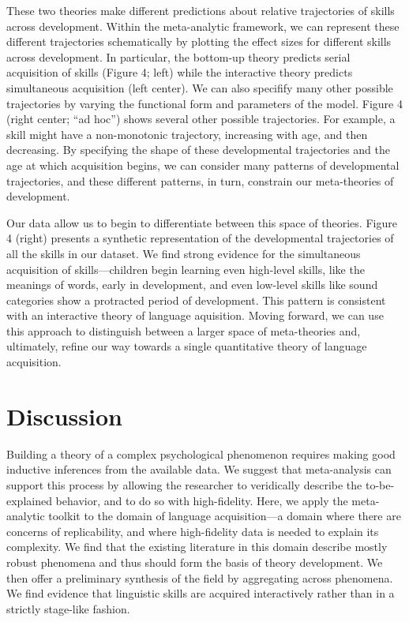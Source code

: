\documentclass[english,floatsintext,man]{apa6}
\begin{document}
These two theories make different predictions about relative
trajectories of skills across development. Within the meta-analytic
framework, we can represent these different trajectories schematically
by plotting the effect sizes for different skills across development. In
particular, the bottom-up theory predicts serial acquisition of skills
(Figure 4; left) while the interactive theory predicts simultaneous
acquisition (left center). We can also specifify many other possible
trajectories by varying the functional form and parameters of the model.
Figure 4 (right center; \enquote{ad hoc}) shows several other possible
trajectories. For example, a skill might have a non-monotonic
trajectory, increasing with age, and then decreasing. By specifying the
shape of these developmental trajectories and the age at which
acquisition begins, we can consider many patterns of developmental
trajectories, and these different patterns, in turn, constrain our
meta-theories of development.

Our data allow us to begin to differentiate between this space of
theories. Figure 4 (right) presents a synthetic representation of the
developmental trajectories of all the skills in our dataset. We find
strong evidence for the simultaneous acquisition of skills---children
begin learning even high-level skills, like the meanings of words, early
in development, and even low-level skills like sound categories show a
protracted period of development. This pattern is consistent with an
interactive theory of language aquisition. Moving forward, we can use
this approach to distinguish between a larger space of meta-theories
and, ultimately, refine our way towards a single quantitative theory of
language acquisition.

\section{Discussion}\label{discussion}

Building a theory of a complex psychological phenomenon requires making
good inductive inferences from the available data. We suggest that
meta-analysis can support this process by allowing the researcher to
veridically describe the to-be-explained behavior, and to do so with
high-fidelity. Here, we apply the meta-analytic toolkit to the domain of
language acquisition---a domain where there are concerns of
replicability, and where high-fidelity data is needed to explain its
complexity. We find that the existing literature in this domain describe
mostly robust phenomena and thus should form the basis of theory
development. We then offer a preliminary synthesis of the field by
aggregating across phenomena. We find evidence that linguistic skills
are acquired interactively rather than in a strictly stage-like fashion.
\end{document}
